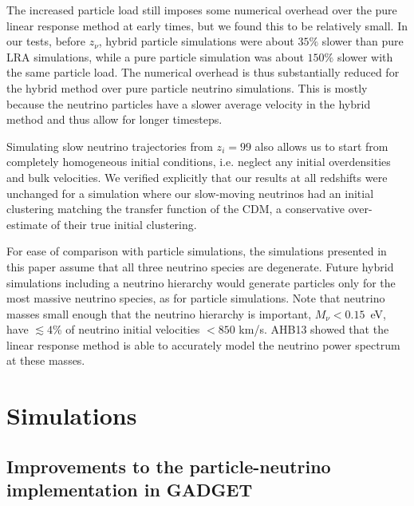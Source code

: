 \documentclass[useAMS, usenatbib]{mnras}
\newcommand{\gadget}{{\small GADGET\,}}
\begin{document}
The increased particle load still imposes some numerical overhead over the pure linear response method at early times, but we found this to be relatively small. In our tests, before $z_\nu$, hybrid particle simulations were about $35\%$ slower than pure LRA simulations, while a pure particle simulation was about $150\%$ slower with the same particle load.
The numerical overhead is thus substantially reduced for the hybrid method over pure particle neutrino simulations. This is mostly because the neutrino particles have a slower average velocity in the hybrid method and thus allow for longer timesteps.

Simulating slow neutrino trajectories from $z_i = 99$ also allows us to start from completely homogeneous initial conditions, i.e. neglect any initial overdensities and bulk velocities. We verified explicitly that our results at all redshifts were unchanged for a simulation where our slow-moving neutrinos had an initial clustering matching the transfer function of the CDM, a conservative over-estimate of their true initial clustering.

For ease of comparison with particle simulations, the simulations presented in this paper assume that all three neutrino species are degenerate. Future hybrid simulations including a neutrino hierarchy would generate particles only for the most massive neutrino species, as for particle simulations. Note that neutrino masses small enough that the neutrino hierarchy is important, $M_\nu < 0.15$~eV, have $\lesssim 4$\% of neutrino initial velocities $< 850$ km/s. AHB13 showed that the linear response method is able to accurately model the neutrino power spectrum at these masses.



\section{Simulations} \label{sec:simulations}


\subsection{Improvements to the particle-neutrino implementation in \gadget}
\end{document}
